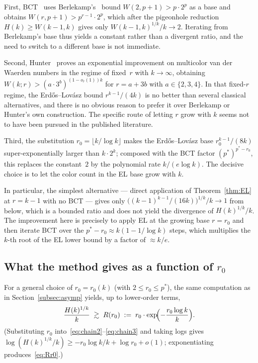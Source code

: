 \documentclass[11pt,reqno,a4paper]{amsart}
\theoremstyle{plain}
\theoremstyle{definition}
\theoremstyle{remark}
\numberwithin{equation}{section}
\begin{document}
First, BCT~\cite[Theorem~2.2]{BCT} uses Berlekamp's~\cite{Berlekamp1968}
bound $W(2,p+1)>p\cdot 2^{p}$ as a base and obtains
$W(r,p+1)>p^{r-1}\cdot 2^{p}$, which after the pigeonhole reduction
$H(k)\ge W(k-1,k)$ gives only $W(k-1,k)^{1/k}/k\to 2$. Iterating from
Berlekamp's base thus yields a constant rather than a divergent
ratio, and the need to switch to a different base is not immediate.

Second, Hunter~\cite{Hunter2025} proves an exponential improvement on
multicolor van der Waerden numbers in the regime of fixed~$r$ with
$k\to\infty$, obtaining $W(k;r)>(a\cdot 3^{b})^{(1-o_{r}(1))k}$ for
$r=a+3b$ with $a\in\{2,3,4\}$. In that fixed-$r$ regime, the
Erd\H{o}s--Lov\'asz bound $r^{k-1}/(4k)$ is no better than several
classical alternatives, and there is no obvious reason to prefer it
over Berlekamp or Hunter's own construction. The specific route of
letting $r$ grow with $k$ seems not to have been pursued in the
published literature.

Third, the substitution $r_{0}=\lfloor k/\log k\rfloor$ makes the
Erd\H{o}s--Lov\'asz base $r_{0}^{k-1}/(8k)$ super-exponentially
larger than $k\cdot 2^{k}$; composed with the BCT factor
$(p^{*})^{p^{*}-r_{0}}$, this replaces the constant~$2$ by the
polynomial rate $k/(e\log k)$. The decisive choice is to let the
color count in the EL base grow with $k$.

In particular, the simplest alternative --- direct application of
Theorem~\ref{thm:EL} at $r=k-1$ with no BCT --- gives only
$\bigl((k-1)^{k-1}/(16k)\bigr)^{1/k}/k\to 1$ from below, which is a
bounded ratio and does not yield the divergence of $H(k)^{1/k}/k$.
The improvement here is precisely to apply EL at the growing base
$r=r_{0}$ and then iterate BCT over the $p^{*}-r_{0}\approx
k(1-1/\log k)$ steps, which multiplies the $k$-th root of the EL
lower bound by a factor of $\approx k/e$.

\subsection{What the method gives as a function of
\texorpdfstring{$r_{0}$}{r0}}
\label{subsec:hard-limit}

For a general choice of $r_{0}=r_{0}(k)$ (with $2\le r_{0}\le p^{*}$),
the same computation as in Section~\ref{subsec:asymp} yields, up to
lower-order terms,
\begin{equation}
\frac{H(k)^{1/k}}{k}\;\gtrsim\;R(r_{0})\;:=\;r_{0}\cdot\exp\!\Bigl(-\frac{r_{0}\log k}{k}\Bigr).
\label{eq:Rr0}
\end{equation}
(Substituting $r_{0}$ into~\eqref{eq:chain2}--\eqref{eq:chain3} and
taking logs gives
$\log(H(k)^{1/k}/k)\ge -r_{0}\log k/k+\log r_{0}+o(1)$; exponentiating
produces~\eqref{eq:Rr0}.)
\end{document}
